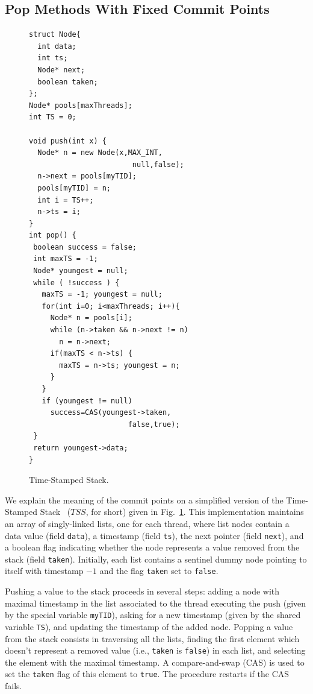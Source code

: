 \subsection{Pop Methods With Fixed Commit Points}
\vspace{-1mm}
\begin{figure}
\vspace{-10.5mm}
\begin{lstlisting}
struct Node{
  int data;
  int ts;
  Node* next;
  boolean taken;
};
Node* pools[maxThreads];
int TS = 0;   

void push(int x) {
  Node* n = new Node(x,MAX_INT,
                        null,false);
  n->next = pools[myTID];
  pools[myTID] = n;
  int i = TS++;
  n->ts = i;
}
int pop() {
 boolean success = false;
 int maxTS = -1;
 Node* youngest = null;
 while ( !success ) {
   maxTS = -1; youngest = null;
   for(int i=0; i<maxThreads; i++){
     Node* n = pools[i];
     while (n->taken && n->next != n)
       n = n->next;
     if(maxTS < n->ts) {
       maxTS = n->ts; youngest = n;
     }
   }
   if (youngest != null)
     success=CAS(youngest->taken,
                       false,true);
 }
 return youngest->data;
}
\end{lstlisting}
\vspace{-6mm}
\caption{Time-Stamped Stack.} %
\label{fig:TimeStamped}
\vspace{-7mm}
\end{figure}
We explain the meaning of the commit points on a simplified version of the Time-Stamped Stack~\cite{DBLP:conf/popl/DoddsHK15} ($\mathit{TSS}$, for short) given in Fig.~\ref{fig:TimeStamped}. This  implementation maintains an array of singly-linked lists, one for each thread, where list nodes contain a data value (field {\tt data}), a timestamp (field {\tt ts}), the next pointer (field {\tt next}), and a boolean flag indicating whether the node represents a value removed from the stack (field {\tt taken}). Initially, each list contains a sentinel dummy node pointing to itself with timestamp $-1$ and the flag {\tt taken} set to {\tt false}.

Pushing a value to the stack proceeds in several steps: adding a node with maximal timestamp in the list associated to the thread executing the push (given by the special variable {\tt myTID}), asking for a new timestamp (given by the shared variable {\tt TS}), and updating the timestamp of the added node. Popping a value from the stack consists in traversing all the lists, finding the first element which doesn't represent a removed value (i.e., {\tt taken} is {\tt false}) in each list, and selecting the element with the maximal timestamp. A compare-and-swap (CAS) is used to set the {\tt taken} flag of this element to {\tt true}. The procedure restarts if the CAS fails.

